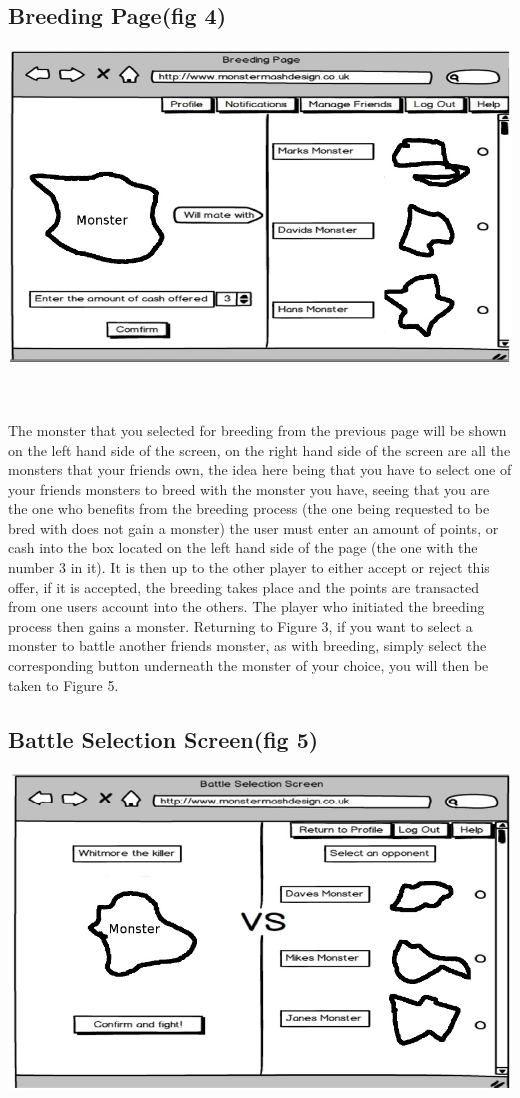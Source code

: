 \documentclass{project}
\begin{document}
\subsection{Breeding Page(fig 4)}
\includegraphics[scale=0.5]{breedingPage.jpg}

\\
\\
The monster that you selected for breeding from the previous page will be shown
on the left hand side of the screen, on the right hand side of the screen are all the
monsters that your friends own, the idea here being that you have to select one of
your friends monsters to breed with the monster you have, seeing that you are the
one who benefits from the breeding process (the one being requested to be bred with
does not gain a monster) the user must enter an amount of points, or cash into the
box located on the left hand side of the page (the one with the number 3 in it). It
is then up to the other player to either accept or reject this offer, if it is accepted,
the breeding takes place and the points are transacted from one users account into
the others. The player who initiated the breeding process then gains a monster.
Returning to Figure 3, if you want to select a monster to battle another friends
monster, as with breeding, simply select the corresponding button underneath the
monster of your choice, you will then be taken to Figure 5.
\newpage

\subsection{Battle Selection Screen(fig 5)}
\includegraphics[scale=0.5]{battleSelection.jpg}
\end{document}

